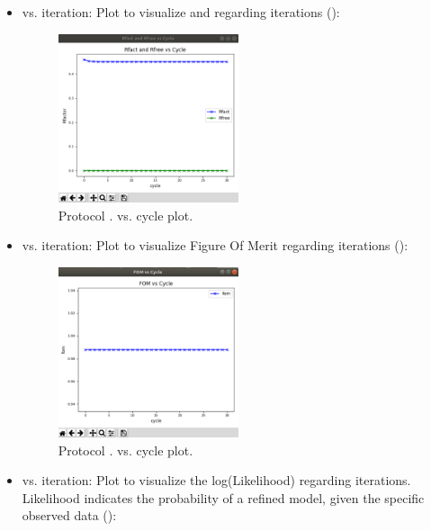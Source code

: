 \begin{itemize}
\begin{itemize}
     \item {} vs. iteration:
     Plot to visualize  and  regarding iterations ():
        \begin{figure}[H]
         \centering 
         \captionsetup{width=.9\linewidth} 
         \includegraphics[width=0.50\textwidth]{Images_appendix/Fig133.pdf}
         \caption{Protocol .  vs. cycle plot.}
         \label{fig:app_protocol_refmac_8}
        \end{figure}
     \item {} vs. iteration:
     Plot to visualize Figure Of Merit regarding iterations ():
        \begin{figure}[H]
         \centering 
         \captionsetup{width=.9\linewidth} 
         \includegraphics[width=0.50\textwidth]{Images_appendix/Fig134.pdf}
         \caption{Protocol .  vs. cycle plot.}
         \label{fig:app_protocol_refmac_9}
        \end{figure}
     \item {} vs. iteration:
     Plot to visualize the log(Likelihood) regarding iterations. Likelihood indicates the probability of a refined model, given the specific observed data  ():

\end{itemize}
\end{itemize}
